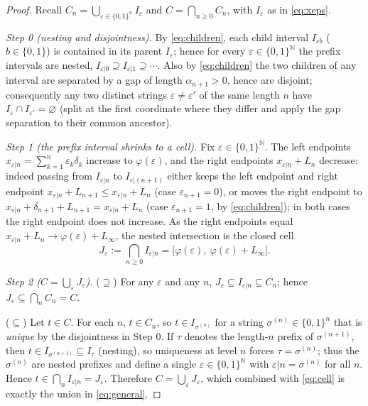 \documentclass{amsart}
\theoremstyle{definition}
\theoremstyle{remark}
\begin{document}
\begin{proof}
Recall $C_n=\bigcup_{\varepsilon\in\{0,1\}^n}I_\varepsilon$ and
$C=\bigcap_{n\ge0}C_n$, with $I_\varepsilon$ as in \eqref{eq:xeps}.

\smallskip
\emph{Step 0 (nesting and disjointness).}
By \eqref{eq:children}, each child interval $I_{\varepsilon b}$ ($b\in\{0,1\}$) is
contained in its parent $I_\varepsilon$; hence for every
$\varepsilon\in\{0,1\}^{\mathbb N}$ the prefix intervals are nested,
$I_{\varepsilon|0}\supseteq I_{\varepsilon|1}\supseteq\cdots$. Also by
\eqref{eq:children} the two children of any interval are separated by a gap of
length $\alpha_{n+1}>0$, hence are disjoint; consequently any two distinct strings
$\varepsilon\ne\varepsilon'$ of the same length $n$ have $I_\varepsilon\cap
I_{\varepsilon'}=\varnothing$ (split at the first coordinate where they differ and
apply the gap separation to their common ancestor).

\smallskip
\emph{Step 1 (the prefix interval shrinks to a cell).}
Fix $\varepsilon\in\{0,1\}^{\mathbb N}$. The left endpoints
$x_{\varepsilon|n}=\sum_{k=1}^{n}\varepsilon_k\delta_k$ increase to
$\varphi(\varepsilon)$, and the right endpoints
$x_{\varepsilon|n}+L_n$ decrease: indeed passing from $I_{\varepsilon|n}$ to
$I_{\varepsilon|(n+1)}$ either keeps the left endpoint and right endpoint
$x_{\varepsilon|n}+L_{n+1}\le x_{\varepsilon|n}+L_n$ (case $\varepsilon_{n+1}=0$),
or moves the right endpoint to $x_{\varepsilon|n}+\delta_{n+1}+L_{n+1}
=x_{\varepsilon|n}+L_n$ (case $\varepsilon_{n+1}=1$, by \eqref{eq:children}); in
both cases the right endpoint does not increase. As the right endpoints equal
$x_{\varepsilon|n}+L_n\to\varphi(\varepsilon)+L_\infty$, the nested intersection is
the closed cell
\begin{equation}\label{eq:cell}
J_\varepsilon:=\bigcap_{n\ge0}I_{\varepsilon|n}
=\bigl[\varphi(\varepsilon),\ \varphi(\varepsilon)+L_\infty\bigr].
\end{equation}

\smallskip
\emph{Step 2 ($C=\bigcup_\varepsilon J_\varepsilon$).}
($\supseteq$) For any $\varepsilon$ and any $n$, $J_\varepsilon\subseteq
I_{\varepsilon|n}\subseteq C_n$; hence $J_\varepsilon\subseteq\bigcap_n C_n=C$.

($\subseteq$) Let $t\in C$. For each $n$, $t\in C_n$, so $t\in I_{\sigma^{(n)}}$
for a string $\sigma^{(n)}\in\{0,1\}^n$ that is \emph{unique} by the disjointness
in Step 0. If $\tau$ denotes the length-$n$ prefix of $\sigma^{(n+1)}$, then
$t\in I_{\sigma^{(n+1)}}\subseteq I_\tau$ (nesting), so uniqueness at level $n$
forces $\tau=\sigma^{(n)}$; thus the $\sigma^{(n)}$ are nested prefixes and define
a single $\varepsilon\in\{0,1\}^{\mathbb N}$ with $\varepsilon|n=\sigma^{(n)}$ for
all $n$. Hence $t\in\bigcap_n I_{\varepsilon|n}=J_\varepsilon$. Therefore
$C=\bigcup_{\varepsilon}J_\varepsilon$, which combined with \eqref{eq:cell} is
exactly the union in \eqref{eq:general}.


\end{proof}
\end{document}
